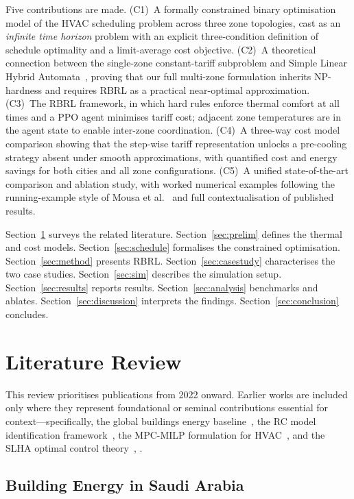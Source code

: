 \documentclass[3p,number]{elsarticle}
\let\oldsection\section
\renewcommand{\section}{\FloatBarrier\oldsection}
\let\oldsubsection\subsection
\renewcommand{\subsection}{\FloatBarrier\oldsubsection}
\begin{document}
Five contributions are made.
(C1)~A formally constrained binary optimisation model of the HVAC scheduling problem across three zone topologies, cast as an \emph{infinite time horizon} problem with an explicit three-condition definition of schedule optimality and a limit-average cost objective.
(C2)~A theoretical connection between the single-zone constant-tariff subproblem and Simple Linear Hybrid Automata~\cite{Mousa2016}, proving that our full multi-zone formulation inherits NP-hardness and requires RBRL as a practical near-optimal approximation.
(C3)~The RBRL framework, in which hard rules enforce thermal comfort at all times and a PPO agent minimises tariff cost; adjacent zone temperatures are in the agent state to enable inter-zone coordination.
(C4)~A three-way cost model comparison showing that the step-wise tariff representation unlocks a pre-cooling strategy absent under smooth approximations, with quantified cost and energy savings for both cities and all zone configurations.
(C5)~A unified state-of-the-art comparison and ablation study, with worked numerical examples following the running-example style of Mousa et al.~\cite{Mousa2016} and full contextualisation of published results.
 
Section~\ref{sec:litreview} surveys the related literature.
Section~\ref{sec:prelim} defines the thermal and cost models.
Section~\ref{sec:schedule} formalises the constrained optimisation.
Section~\ref{sec:method} presents RBRL.
Section~\ref{sec:casestudy} characterises the two case studies.
Section~\ref{sec:sim} describes the simulation setup.
Section~\ref{sec:results} reports results.
Section~\ref{sec:analysis} benchmarks and ablates.
Section~\ref{sec:discussion} interprets the findings.
Section~\ref{sec:conclusion} concludes.
 
\section{Literature Review}
\label{sec:litreview}
 
This review prioritises publications from 2022 onward.
Earlier works are included only where they represent foundational or seminal contributions essential for context---specifically, the global buildings energy baseline~\cite{PerezLombard2008}, the RC model identification framework~\cite{Bacher2011}, the MPC-MILP formulation for HVAC~\cite{Risbeck2017}, and the SLHA optimal control theory~\cite{Mousa2016}, \cite{Mousa2017}.
 
\subsection{Building Energy in Saudi Arabia}
 
\end{document}
